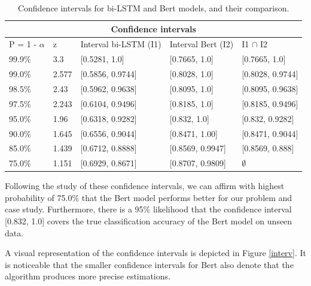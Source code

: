 \documentclass[runningheads,a4paper,11pt]{report}
\begin{document}
\begin{table}
\begin{center}
    \begin{tabular}{ | m{1.5cm} | m{1cm}| m{4cm} | m{4cm} | m{4cm} |} 
    \hline
    \multicolumn{5}{|c|}{Confidence intervals} \\
    \hline
    P = 1 - $\alpha$ & z & Interval bi-LSTM (I1) & Interval Bert (I2) &  I1 $\cap$ I2 \\
    \hline
    99.9\% & 3.3 & [0.5281, 1.0] & [0.7665, 1.0] & [0.7665, 1.0] \\ 
    99.0\% & 2.577 & [0.5856, 0.9744] & [0.8028, 1.0] & [0.8028, 0.9744] \\ 
    98.5\% & 2.43 & [0.5962, 0.9638] & [0.8095, 1.0] & [0.8095,  0.9638] \\ 
    97.5\% & 2.243 & [0.6104, 0.9496] & [0.8185, 1.0] & [0.8185, 0.9496] \\ 
    95.0\% & 1.96 & [0.6318, 0.9282] & [0.832, 1.0] & [0.832, 0.9282] \\ 
    90.0\% & 1.645 & [0.6556, 0.9044] & [0.8471, 1.00] & [0.8471, 0.9044] \\ 
    85.0\% & 1.439 & [0.6712, 0.8888] & [0.8569, 0.9947] & [0.8569, 0.888] \\ 
    75.0\% & 1.151 & [0.6929, 0.8671] & [0.8707, 0.9809] & $\emptyset$ \\
    \hline
    \end{tabular}
\end{center}
\caption{Confidence intervals for bi-LSTM and Bert models, and their comparison.}
\label{compInt}
\end{table}

Following the study of these confidence intervals, we can affirm with highest probability of 75.0\% that the Bert model performs better for our problem and case study. Furthermore, there is a 95\% likelihood that the confidence interval [0.832, 1.0] covers the true classification accuracy of the Bert model on unseen data.

A visual representation of the confidence intervals is depicted in Figure \ref{interv}. It is noticeable that the smaller confidence intervals for Bert also denote that the algorithm produces more precise estimations.
\end{document}
